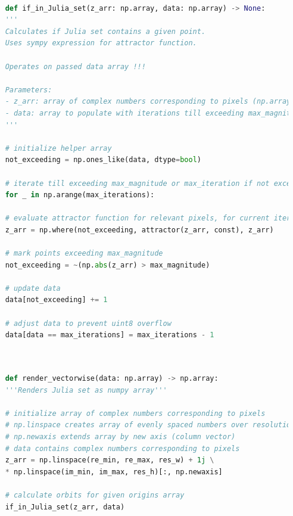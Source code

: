 \documentclass{article}
\begin{document}
\begin{lstlisting}[language=Python, caption=Function to check if in Julia set]
	
	def if_in_Julia_set(z_arr: np.array, data: np.array) -> None:
	'''
	Calculates if Julia set contains a given point.
	Uses sympy expression for attractor function.
	
	Operates on passed data array !!!
	
	Parameters:
	- z_arr: array of complex numbers corresponding to pixels (np.array)
	- data: array to populate with iterations till exceeding max_magnitude or max_iteration if not exceeded (np.array)
	'''
	
	# initialize helper array
	not_exceeding = np.ones_like(data, dtype=bool)
	
	# iterate till exceeding max_magnitude or max_iteration if not exceeded
	for _ in np.arange(max_iterations):
	
	# evaluate attractor function for relevant pixels, for current iteration
	z_arr = np.where(not_exceeding, attractor(z_arr, const), z_arr)
	
	# mark points exceeding max_magnitude
	not_exceeding = ~(np.abs(z_arr) > max_magnitude)
	
	# update data
	data[not_exceeding] += 1
	
	# adjust data to prevent uint8 overflow
	data[data == max_iterations] = max_iterations - 1
	
\end{lstlisting}

\pagebreak
{}

\begin{lstlisting}[language=Python, caption=Renderer]
	
	def render_vectorwise(data: np.array) -> np.array:
	'''Renders Julia set as numpy array'''
	
	# initialize array of complex numbers corresponding to pixels
	# np.linspace creates array of evenly spaced numbers over resolution range
	# np.newaxis extends array by new axis (column vector)
	# data contains complex numbers corresponding to pixels
	z_arr = np.linspace(re_min, re_max, res_w) + 1j \
	* np.linspace(im_min, im_max, res_h)[:, np.newaxis]
	
	# calculate orbits for given origins array
	if_in_Julia_set(z_arr, data)
	
\end{lstlisting}

\end{document}
